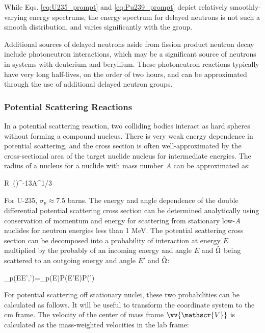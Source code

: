 While Eqs. \eqref{eq:U235_prompt} and \eqref{eq:Pu239_prompt} depict relatively smoothly-varying energy spectrums, the energy spectrum for delayed neutrons is not such a smooth distribution, and varies significantly with the group.

Additional sources of delayed neutrons aside from fission product neutron decay include photoneutron interactions, which may be a significant source of neutrons in systems with deuterium and beryllium. These photoneutron reactions typically have very long half-lives, on the order of two hours, and can be approximated through the use of additional delayed neutron groups.

\subsubsection{Potential Scattering Reactions}
\label{sec:PotentialStationary}

In a potential scattering reaction, two colliding bodies interact as hard spheres without forming a compound nucleus. There is very weak energy dependence in potential scattering, and the cross section is often well-approximated by the cross-sectional area of the target nuclide nucleus for intermediate energies. The radius of a nucleus for a nuclide with mass number \(A\) can be approximated as:

\beq
R\ ()^{-13}A^{1/3}
\eeq

For U-235, \(\sigma_p\approx7.5\) barns. The energy and angle dependence of the double differential potential scattering cross section can be determined analytically using conservation of momentum and energy for scattering from stationary low-\(A\) nuclides for neutron energies less than 1 MeV. The potential scattering cross section can be decomposed into a probability of interaction at energy \(E\) multiplied by the probably of an incoming energy and angle \(E\) and \(\hat{\Omega}\) being scattered to an outgoing energy and angle \(E'\) and \(\hat{\Omega}\):

\beq
\label{eq:DifferentialSigma}
\sigma_p(E\rightarrow E',\hO\rightarrow\hO')=\sigma_p(E)P(E'\rightarrow E)P(\hO\rightarrow\hO')
\eeq

For potential scattering off stationary nuclei, these two probabilities can be calculated as follows. It will be useful to transform the coordinate system to the \gls{cm} frame. The velocity of the center of mass frame \(\vv{\mathscr{V}}\) is calculated as the mass-weighted velocities in the lab frame:

